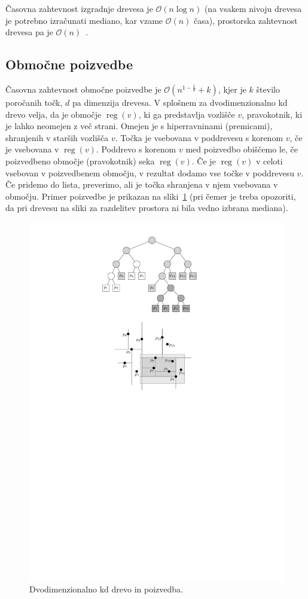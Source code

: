 \documentclass[a4paper, 12pt]{book}
\newcommand{\OO}{\ensuremath{\mathcal{O}}} %
\begin{document}
Časovna zahtevnost izgradnje drevesa je $\OO(n\log n)$ (na vsakem nivoju drevesa je potrebno izračunati mediano, kar vzame $\OO(n)$ časa), prostorska zahtevnost drevesa pa je $\OO(n)$~\cite[poglavje~5.2]{bkos-08-all}.
\subsection{Območne poizvedbe}
Časovna zahtevnost območne poizvedbe je $\OO(n^{1-\frac{1}{d}} + k)$, kjer je $k$ število poročanih točk, $d$ pa dimenzija drevesa. V splošnem za dvodimenzionalno kd drevo velja, da je območje $\operatorname{reg}(v)$, ki ga predstavlja vozlišče $v$, pravokotnik, ki je lahko neomejen z več strani. Omejen je s hiperravninami (premicami), shranjenih v starših vozlišča $v$. Točka je vsebovana v poddrevesu s korenom $v$, če je vsebovana v $\operatorname{reg}(v)$. Poddrevo s korenom $v$ med poizvedbo obiščemo le, če poizvedbeno območje (pravokotnik) seka $\operatorname{reg}(v)$. Če
je $\operatorname{reg}(v)$ v celoti vsebovan v poizvedbenem območju, v rezultat dodamo vse točke v poddrevesu $v$. Če pridemo do lista, preverimo, ali je točka shranjena v njem vsebovana v območju. Primer poizvedbe je prikazan na sliki~\ref{kd-primer} (pri čemer je treba opozoriti, da pri drevesu na sliki za razdelitev prostora ni bila vedno izbrana mediana).

\begin{figure}[htp]
\centerline{\includegraphics[scale=1.2]{pics/kdTree4.pdf}}		
\caption{Dvodimenzionalno kd drevo in poizvedba.}		
\label{kd-primer}		
\end{figure}
\end{document}
